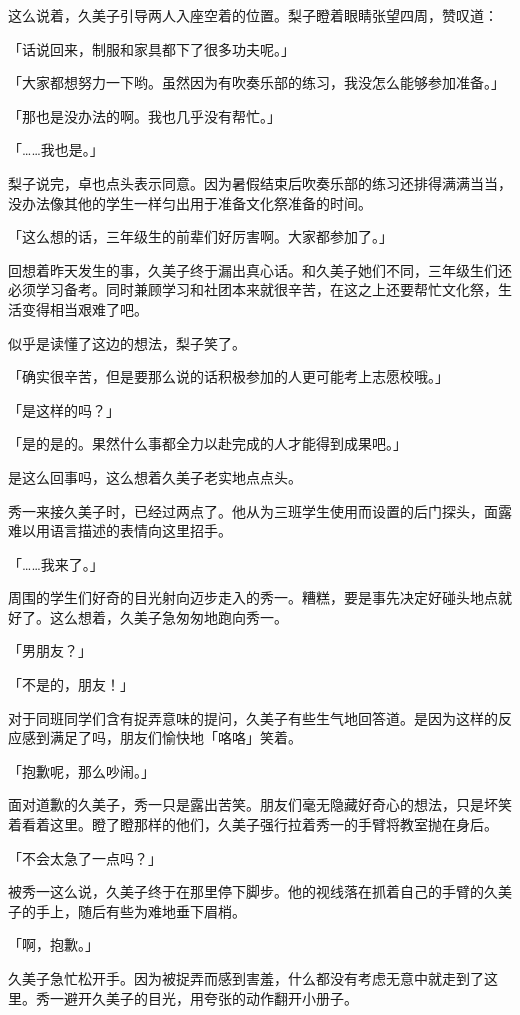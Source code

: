 \documentclass[UTF8]{ctexart}
\begin{document}
    这么说着，久美子引导两人入座空着的位置。梨子瞪着眼睛张望四周，赞叹道：

    「话说回来，制服和家具都下了很多功夫呢。」

    「大家都想努力一下哟。虽然因为有吹奏乐部的练习，我没怎么能够参加准备。」

    「那也是没办法的啊。我也几乎没有帮忙。」

    「……我也是。」

    梨子说完，卓也点头表示同意。因为暑假结束后吹奏乐部的练习还排得满满当当，没办法像其他的学生一样匀出用于准备文化祭准备的时间。

    「这么想的话，三年级生的前辈们好厉害啊。大家都参加了。」

    回想着昨天发生的事，久美子终于漏出真心话。和久美子她们不同，三年级生们还必须学习备考。同时兼顾学习和社团本来就很辛苦，在这之上还要帮忙文化祭，生活变得相当艰难了吧。

    似乎是读懂了这边的想法，梨子笑了。

    「确实很辛苦，但是要那么说的话积极参加的人更可能考上志愿校哦。」

    「是这样的吗？」

    「是的是的。果然什么事都全力以赴完成的人才能得到成果吧。」

    是这么回事吗，这么想着久美子老实地点点头。

    秀一来接久美子时，已经过两点了。他从为三班学生使用而设置的后门探头，面露难以用语言描述的表情向这里招手。

    「……我来了。」

    周围的学生们好奇的目光射向迈步走入的秀一。糟糕，要是事先决定好碰头地点就好了。这么想着，久美子急匆匆地跑向秀一。

    「男朋友？」

    「不是的，朋友！」

    对于同班同学们含有捉弄意味的提问，久美子有些生气地回答道。是因为这样的反应感到满足了吗，朋友们愉快地「咯咯」笑着。

    「抱歉呢，那么吵闹。」

    面对道歉的久美子，秀一只是露出苦笑。朋友们毫无隐藏好奇心的想法，只是坏笑着看着这里。瞪了瞪那样的他们，久美子强行拉着秀一的手臂将教室抛在身后。

    「不会太急了一点吗？」

    被秀一这么说，久美子终于在那里停下脚步。他的视线落在抓着自己的手臂的久美子的手上，随后有些为难地垂下眉梢。

    「啊，抱歉。」

    久美子急忙松开手。因为被捉弄而感到害羞，什么都没有考虑无意中就走到了这里。秀一避开久美子的目光，用夸张的动作翻开小册子。
\end{document}
